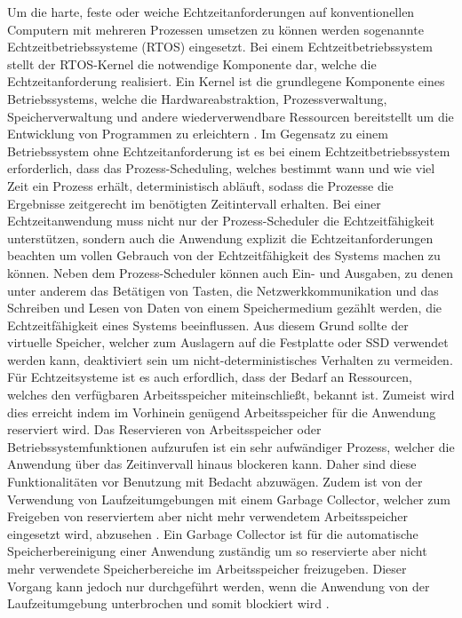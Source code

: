 Um die harte, feste oder weiche Echtzeitanforderungen auf konventionellen Computern mit mehreren Prozessen umsetzen zu können werden sogenannte Echtzeitbetriebssysteme (RTOS) eingesetzt. Bei einem Echtzeitbetriebssystem stellt der RTOS-Kernel die notwendige Komponente dar, welche die Echtzeitanforderung realisiert\cite[343\psq]{worn_echtzeitsysteme_2006}. Ein Kernel ist die grundlegene Komponente eines Betriebssystems, welche die Hardwareabstraktion, Prozessverwaltung, Speicherverwaltung und andere wiederverwendbare Ressourcen bereitstellt um die Entwicklung von Programmen zu erleichtern \cite[356]{worn_echtzeitsysteme_2006}. Im Gegensatz zu einem Betriebssystem ohne Echtzeitanforderung ist es bei einem Echtzeitbetriebssystem erforderlich, dass das Prozess-Scheduling, welches bestimmt wann und wie viel Zeit ein Prozess erhält, deterministisch abläuft, sodass die Prozesse die Ergebnisse zeitgerecht im benötigten Zeitintervall erhalten. Bei einer Echtzeitanwendung muss nicht nur der Prozess-Scheduler die Echtzeitfähigkeit unterstützen, sondern auch die Anwendung explizit die Echtzeitanforderungen beachten um vollen Gebrauch von der Echtzeitfähigkeit des Systems machen zu können. Neben dem Prozess-Scheduler können auch Ein- und Ausgaben, zu denen unter anderem das Betätigen von Tasten, die Netzwerkkommunikation und das Schreiben und Lesen von Daten von einem Speichermedium gezählt werden, die Echtzeitfähigkeit eines Systems beeinflussen. Aus diesem Grund sollte der virtuelle Speicher, welcher zum Auslagern auf die Festplatte oder SSD verwendet werden kann, deaktiviert sein um nicht-deterministisches Verhalten zu vermeiden. Für Echtzeitsysteme ist es auch erfordlich, dass der Bedarf an Ressourcen, welches den verfügbaren Arbeitsspeicher miteinschließt, bekannt ist. Zumeist wird dies erreicht indem im Vorhinein genügend Arbeitsspeicher für die Anwendung reserviert wird. Das Reservieren von Arbeitsspeicher oder Betriebssystemfunktionen aufzurufen ist ein sehr aufwändiger Prozess, welcher die Anwendung über das Zeitinvervall hinaus blockeren kann. Daher sind diese Funktionalitäten vor Benutzung mit Bedacht abzuwägen. Zudem ist von der Verwendung von Laufzeitumgebungen mit einem Garbage Collector, welcher zum Freigeben von reserviertem aber nicht mehr verwendetem Arbeitsspeicher eingesetzt wird, abzusehen \cite{echtzeitsystem_2020}. Ein Garbage Collector ist für die automatische Speicherbereinigung einer Anwendung zuständig um so reservierte aber nicht mehr verwendete Speicherbereiche im Arbeitsspeicher freizugeben. Dieser Vorgang kann jedoch nur durchgeführt werden, wenn die Anwendung von der Laufzeitumgebung unterbrochen und somit blockiert wird \cite{garbage_collector_2020}.

